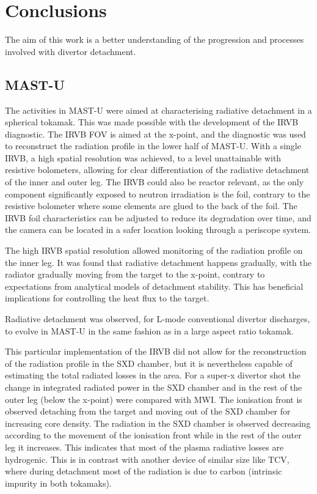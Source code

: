 \chapter{Conclusions}\label{chapter4}

The aim of this work is a better understanding of the progression and processes involved with divertor detachment. %

\section{MAST-U}

The activities in MAST-U were aimed at characterising radiative detachment in a spherical tokamak. This was made possible with the development of the IRVB diagnostic. The IRVB FOV is aimed at the x-point, and the diagnostic was used to reconstruct the radiation profile in the lower half of MAST-U. With a single IRVB, a high spatial resolution was achieved, to a level unattainable with resistive bolometers, allowing for clear differentiation of the radiative detachment of the inner and outer leg. The IRVB could also be reactor relevant, as the only component significantly exposed to neutron irradiation is the foil, contrary to the resistive bolometer where some elements are glued to the back of the foil. The IRVB foil characteristics can be adjusted to reduce its degradation over time, and the camera can be located in a safer location looking through a periscope system.

The high IRVB spatial resolution allowed monitoring of the radiation profile on the inner leg. It was found that radiative detachment happens gradually, with the radiator gradually moving from the target to the x-point, contrary to expectations from analytical models of detachment stability. This has beneficial implications for controlling the heat flux to the target.

Radiative detachment was observed, for L-mode conventional divertor discharges, to evolve in MAST-U in the same fashion as in a large aspect ratio tokamak.

This particular implementation of the IRVB did not allow for the reconstruction of the radiation profile in the SXD chamber, but it is nevertheless capable of estimating the total radiated losses in the area. For a super-x divertor shot the change in integrated radiated power in the SXD chamber and in the rest of the outer leg (below the x-point) were compared with MWI. The ionisation front is observed detaching from the target and moving out of the SXD chamber for increasing core density. The radiation in the SXD chamber is observed decreasing according to the movement of the ionisation front while in the rest of the outer leg it increases. This indicates that most of the plasma radiative losses are hydrogenic. This is in contrast with another device of similar size like TCV, where during detachment most of the radiation is due to carbon (intrinsic impurity in both tokamaks).

